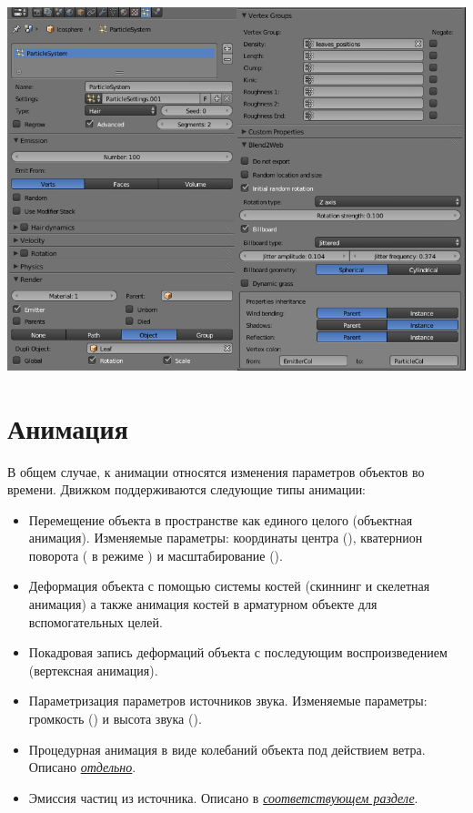 \documentclass[a4paper,12pt,oneside]{sphinxmanual}
\begin{document}
{\hfill\includegraphics[width=1.000\linewidth]{particle_settings.jpg}\hfill}
\label{animation:animation}

\chapter{Анимация}
\label{animation:index-0}\label{animation::doc}\label{animation:id1}
В общем случае, к анимации относятся изменения параметров объектов во времени.
Движком поддерживаются следующие типы анимации:
\begin{itemize}
\item {} 
Перемещение объекта в пространстве как единого целого (объектная анимация).
Изменяемые параметры: координаты центра (), кватернион поворота
( в режиме ) и масштабирование ().

\item {} 
Деформация объекта с помощью системы костей (скиннинг и скелетная анимация) а
также анимация костей в арматурном объекте для вспомогательных целей.

\item {} 
Покадровая запись деформаций объекта с последующим воспроизведением
(вертексная анимация).

\item {} 
Параметризация параметров источников звука. Изменяемые параметры: громкость
() и высота звука ().

\item {} 
Процедурная анимация в виде колебаний объекта под действием ветра. Описано
{\hyperref[outdoor_rendering:wind]{\emph{отдельно}}}.

\item {} 
Эмиссия частиц из источника. Описано в {\hyperref[particles:particles]{\emph{соответствующем разделе}}}.

\end{itemize}
\end{document}
